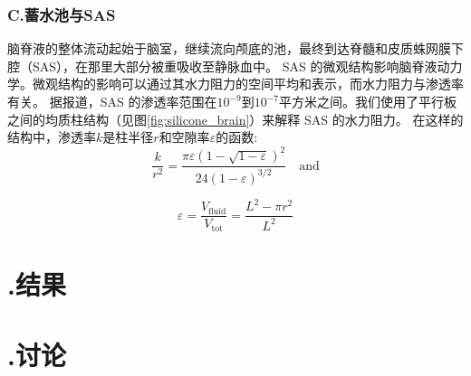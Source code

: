 \documentclass[12pt]{article}
\begin{document}
\subsubsection*{C.蓄水池与SAS}
脑脊液的整体流动起始于脑室，继续流向颅底的池，最终到达脊髓和皮质蛛网膜下腔（SAS），在那里大部分被重吸收至静脉血中。
SAS 的微观结构影响脑脊液动力学。微观结构的影响可以通过其水力阻力的空间平均和表示，而水力阻力与渗透率有关。
据报道，SAS 的渗透率范围在$10^{-9}$到$10^{-7}$平方米之间。我们使用了平行板之间的均质柱结构（见图\ref{fig:silicone_brain}）来解释 SAS 的水力阻力。
在这样的结构中，渗透率$k$是柱半径$r$和空隙率$\varepsilon$的函数:
\begin{equation}
    \frac{k}{r^2} = \frac{\pi \varepsilon \left(1 - \sqrt{1 - \varepsilon}\right)^2}{24 \left(1 - \varepsilon\right)^{3/2}} \quad \text{and}
\end{equation}

\begin{equation}
    \varepsilon = \frac{V_{\text{fluid}}}{V_{\text{tot}}} = \frac{L^2 - \pi r^2}{L^2}
\end{equation}



\section*{\uppercase\expandafter{}.结果}

\section*{\uppercase\expandafter{}.讨论}
\end{document}
